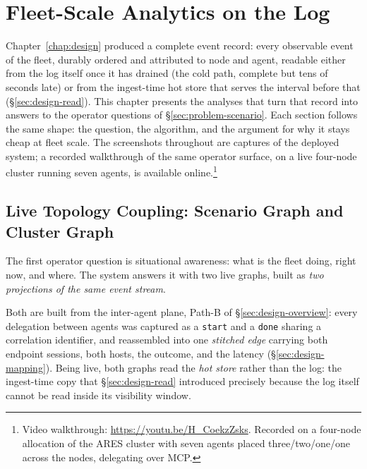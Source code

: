\chapter{Fleet-Scale Analytics on the Log}
\label{chap:analytics}

Chapter~\ref{chap:design} produced a complete event record: every observable
event of the fleet, durably ordered and attributed to node and agent,
readable either from the log itself once it has drained (the cold path,
complete but tens of seconds late) or from the ingest-time hot store that
serves the interval before that (\S\ref{sec:design-read}).
This chapter presents the analyses that turn that record into
answers to the operator questions of \S\ref{sec:problem-scenario}. Each
section follows the same shape: the question, the algorithm, and the
argument for why it stays cheap at fleet scale. The screenshots throughout
are captures of the deployed system; a recorded walkthrough of the same
operator surface, on a live four-node cluster running seven agents, is
available online.\footnote{Video walkthrough:
\url{https://youtu.be/H_CoekzZsks}. Recorded on a four-node allocation of
the ARES cluster with seven agents placed three/two/one/one across the
nodes, delegating over MCP.}

\section{Live Topology Coupling: Scenario Graph and Cluster Graph}
\label{sec:analytics-topology}

The first operator question is situational awareness: what is the fleet doing,
right now, and where. The system answers it with two live graphs, built as
\emph{two projections of the same event stream}.

Both are built from the inter-agent plane, Path-B of
\S\ref{sec:design-overview}: every delegation between agents was captured as
a \texttt{start} and a \texttt{done} sharing a correlation identifier, and
reassembled into one \emph{stitched edge} carrying both endpoint sessions,
both hosts, the outcome, and the latency (\S\ref{sec:design-mapping}). Being
live, both graphs read the \emph{hot store} rather than the log: the
ingest-time copy that \S\ref{sec:design-read} introduced precisely because
the log itself cannot be read inside its visibility window.

